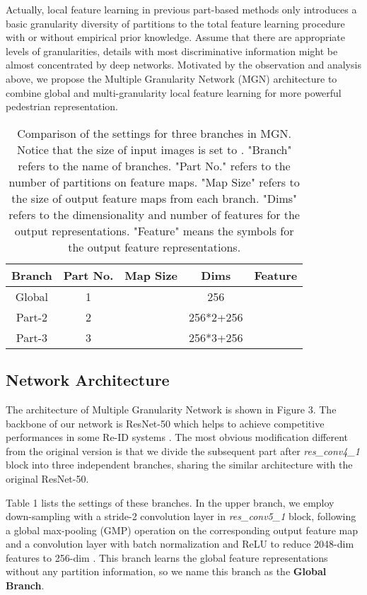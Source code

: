 \documentclass[sigconf]{acmart}
\begin{document}
Actually, local feature learning in previous part-based methods only introduces a basic granularity diversity of partitions to the total feature learning procedure with or without empirical prior knowledge. Assume that there are appropriate levels of granularities, details with most discriminative information might be almost concentrated by deep networks. Motivated by the observation and analysis above, we propose the Multiple Granularity Network (MGN) architecture to combine global and multi-granularity local feature learning for more powerful pedestrian representation. 

\begin{table} \footnotesize 
	\begin{tabular}{ccccc}
		\toprule
		Branch & Part No. & Map Size & Dims & Feature \\ 
		\midrule
		Global & 1 &  & 256 & \\
		Part-2 & 2 &  & 256*2+256 & \\
		Part-3 & 3 &  & 256*3+256 & \\
		\bottomrule
	\end{tabular}
	\caption{Comparison of the settings for three branches in MGN. Notice that the size of input images is set to . "Branch" refers to the name of branches. "Part No." refers to the number of partitions on feature maps. "Map Size" refers to the size of output feature maps from each branch. "Dims" refers to the dimensionality and number of features for the output representations. "Feature" means the symbols for the output feature representations.}
\end{table}

\subsection{Network Architecture}
The architecture of Multiple Granularity Network is shown in Figure 3. The backbone of our network is ResNet-50 which helps to achieve competitive performances in some Re-ID systems \cite{zhang2017alignedreid,bai2017deep,sun2017beyond}. The most obvious modification different from the original version is that we divide the subsequent part after \textit{res\_conv4\_1} block into three independent branches, sharing the similar architecture with the original ResNet-50.

Table 1 lists the settings of these branches. In the upper branch, we employ down-sampling with a stride-2 convolution layer in \textit{res\_conv5\_1} block, following a global max-pooling (GMP) \cite{almazan2018red} operation on the corresponding output feature map and a  convolution layer with batch normalization \cite{ioffe2015batch} and ReLU to reduce 2048-dim features  to 256-dim . This branch learns the global feature representations without any partition information, so we name this branch as the \textbf{Global Branch}.
\end{document}
